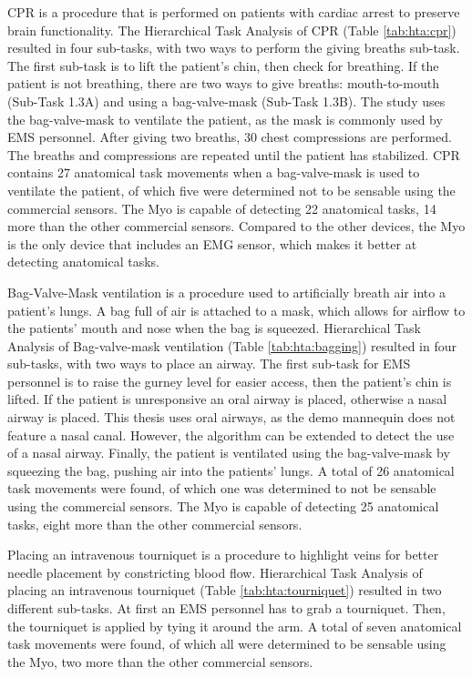 \par CPR is a procedure that is performed on patients with cardiac arrest to preserve brain functionality. The Hierarchical Task Analysis of CPR (Table \ref{tab:hta:cpr}) resulted in four sub-tasks, with two ways to perform the giving breaths sub-task. The first sub-task is to lift the patient's chin, then check for breathing. If the patient is not breathing, there are two ways to give breaths: mouth-to-mouth (Sub-Task 1.3A) and using a bag-valve-mask (Sub-Task 1.3B). The study uses the bag-valve-mask to ventilate the patient, as the mask is commonly used by EMS personnel. After giving two breaths, 30 chest compressions are performed. The breaths and compressions are repeated until the patient has stabilized. CPR contains 27 anatomical task movements when a bag-valve-mask is used to ventilate the patient, of which five were determined not to be sensable using the commercial sensors. The Myo is capable of detecting 22 anatomical tasks, 14 more than the other commercial sensors. Compared to the other devices, the Myo is the only device that includes an EMG sensor, which makes it better at detecting anatomical tasks.
\par Bag-Valve-Mask ventilation is a procedure used to artificially breath air into a patient's lungs. A bag full of air is attached to a mask, which allows for airflow to the patients' mouth and nose when the bag is squeezed. Hierarchical Task Analysis of Bag-valve-mask ventilation (Table \ref{tab:hta:bagging}) resulted in four sub-tasks, with two ways to place an airway. The first sub-task for EMS personnel is to raise the gurney level for easier access, then the patient's chin is lifted. If the patient is unresponsive an oral airway is placed, otherwise a nasal airway is placed. This thesis uses oral airways, as the demo mannequin does not feature a nasal canal. However, the algorithm can be extended to detect the use of a nasal airway. Finally, the patient is ventilated using the bag-valve-mask by squeezing the bag, pushing air into the patients' lungs. A total of 26 anatomical task movements were found, of which one was determined to not be sensable using the commercial sensors. The Myo is capable of detecting 25 anatomical tasks, eight more than the other commercial sensors.
\par Placing an intravenous tourniquet is a procedure to highlight veins for better needle placement by constricting blood flow. Hierarchical Task Analysis of placing an intravenous tourniquet (Table \ref{tab:hta:tourniquet}) resulted in two different sub-tasks. At first an EMS personnel has to grab a tourniquet. Then, the tourniquet is applied by tying it around the arm. A total of seven anatomical task movements were found, of which all were determined to be sensable using the Myo, two more than the other commercial sensors.
